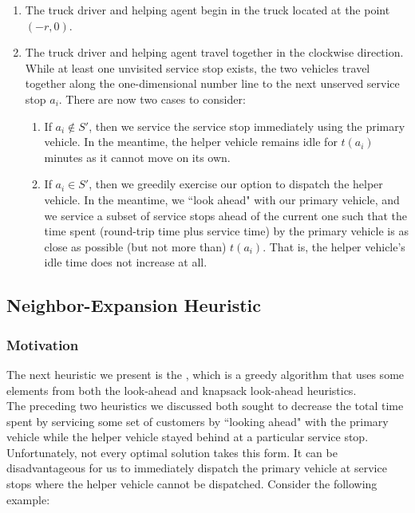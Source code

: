\documentclass[12pt]{scrartcl}
\begin{document}
\begin{enumerate}
    \item The truck driver and helping agent begin in the truck located at the point $(-r, 0)$.
    \item The truck driver and helping agent travel together in the clockwise direction. While at least one unvisited service stop exists, the two vehicles travel together along the one-dimensional number line to the next unserved service stop $a_i$. There are now two cases to consider:
    \begin{enumerate}
        \item If $a_i \not \in S'$, then we service the service stop immediately using the primary vehicle. In the meantime, the helper vehicle remains idle for $t(a_i)$ minutes as it cannot move on its own.
        \item If $a_i \in S'$, then we greedily exercise our option to dispatch the helper vehicle. In the meantime, we ``look ahead" with our primary vehicle, and we service a subset of service stops ahead of the current one such that the time spent (round-trip time plus service time) by the primary vehicle is as close as possible (but not more than) $t(a_i)$. That is, the helper vehicle's idle time does not increase at all. 
    \end{enumerate}
\end{enumerate}



\subsection{Neighbor-Expansion Heuristic}
\subsubsection{Motivation}
The next heuristic we present is the , which is a greedy algorithm that uses some elements from both the look-ahead and knapsack look-ahead heuristics. \\

The preceding two heuristics we discussed both sought to decrease the total time spent by servicing some set of customers by ``looking ahead" with the primary vehicle while the helper vehicle stayed behind at a particular service stop. \\

Unfortunately, not every optimal solution takes this form. It can be disadvantageous for us to immediately dispatch the primary vehicle at service stops where the helper vehicle cannot be dispatched. Consider the following example:
\end{document}
